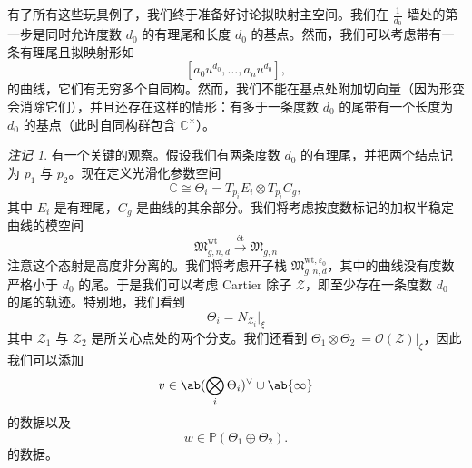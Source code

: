 \documentclass{amsart}
\theoremstyle{definition}
\theoremstyle{remark}
\newtheorem{rmk}[thm]{注记}
\theoremstyle{plain}
\theoremstyle{definition}
\theoremstyle{remark}
\newcommand{\C}{\mathbb{C}}
\renewcommand{\P}{\mathbb{P}}
\newcommand{\ep}{\varepsilon}
\newcommand{\mc}[1]{\mathcal{#1}}
\newcommand{\mf}[1]{\mathfrak{#1}}
\newcommand{\mr}[1]{\mathrm{#1}}
\newcommand{\1}{\mathbf{1}}
\newcommand{\2}{\mathbf{2}}
\newcommand{\3}{\mathbf{3}}
\begin{document}
有了所有这些玩具例子，我们终于准备好讨论拟映射主空间。我们在 \(\frac{1}{d_0}\) 墙处的第一步是同时允许度数 \(d_0\) 的有理尾和长度 \(d_0\) 的基点。然而，我们可以考虑带有一条有理尾且拟映射形如
\[ [a_0 u^{d_0}, \ldots, a_n u^{d_0}], \]
的曲线，它们有无穷多个自同构。然而，我们不能在基点处附加切向量（因为形变会消除它们），并且还存在这样的情形：有多于一条度数 \(d_0\) 的尾带有一个长度为 \(d_0\) 的基点（此时自同构群包含 \(\C^{\times}\)）。

\begin{rmk}
    有一个关键的观察。假设我们有两条度数 \(d_0\) 的有理尾，并把两个结点记为 \(p_1\) 与 \(p_2\)。现在定义光滑化参数空间
    \[ \C \cong \Theta_i = T_{p_i} E_i \otimes T_{p_i} C_g, \]
    其中 \(E_i\) 是有理尾，\(C_g\) 是曲线的其余部分。我们将考虑按度数标记的加权半稳定曲线的模空间
    \[ \mf{M}_{g,n,d}^{\mr{wt}} \xrightarrow{\text{\'et}} \mf{M}_{g,n} \]
    注意这个态射是高度非分离的。我们将考虑开子栈 \(\mf{M}_{g,n,d}^{\mr{wt}, \ep_0}\)，其中的曲线没有度数严格小于 \(d_0\) 的尾。于是我们可以考虑 Cartier 除子 \(\mc{Z}\)，即至少存在一条度数 \(d_0\) 的尾的轨迹。特别地，我们看到
    \[ \Theta_i = N_{\mc{Z}_i} |_{\xi} \]
    其中 \(\mc{Z}_1\) 与 \(\mc{Z}_2\) 是所关心点处的两个分支。我们还看到 \(\Theta_1 \otimes \Theta_2\ = \mc{O}(\mc{Z})|_{\xi}\)，因此我们可以添加
    \[ v \in \ab(\bigotimes_i \Theta_i)^{\vee} \cup \ab\{\infty\} \]
    的数据以及 
    \[ w \in \P(\Theta_1 \oplus\Theta_2). \]
    的数据。
\end{rmk}
\end{document}

